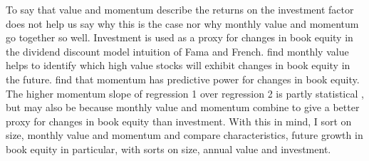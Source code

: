 To say that value and momentum describe the returns on the investment factor
does not help us say why this is the case nor why monthly value and momentum
go together so well.
Investment is used as a proxy for changes in book equity in the dividend
discount model intuition of Fama and French.
\textcite{kok2017facts} find monthly value helps to identify which high value
stocks will exhibit changes in book equity in the future.
\textcite{asness2013devil} find that momentum has predictive power for changes
in book equity.
The higher momentum slope of regression 1 over regression 2 is partly
statistical \parencite{fama2015incremental}, but may also be because monthly
value and momentum combine to give a better proxy for changes in book equity
than investment.
With this in mind, I sort on size, monthly value and momentum and compare
characteristics, future growth in book equity in particular, with sorts on
size, annual value and investment.

